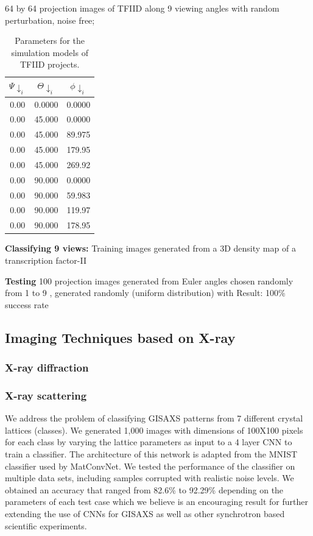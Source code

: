 64 by 64 projection images of TFIID along 9 viewing angles with random perturbation, noise free;

\begin{table}[]
\centering
\caption{Parameters for the simulation models of TFIID projects.}
\label{my-label}
\begin{tabular}{|c|c|c|}
\hline
 $\Psi\downarrow_i$    & $\Theta\downarrow_i$       & $\phi\downarrow_i$
 \\
 \hline
0.00 & 0.0000 & 0.0000 \\
0.00 & 45.000 & 0.0000 \\
0.00 & 45.000 & 89.975 \\
0.00 & 45.000 & 179.95 \\
0.00 & 45.000 & 269.92 \\
0.00 & 90.000 & 0.0000 \\
0.00 & 90.000 & 59.983 \\
0.00 & 90.000 & 119.97 \\
0.00 & 90.000 & 178.95 \\
\hline
\end{tabular}
\end{table}

\textbf{Classifying 9 views:}
Training images generated from a 3D density map of a transcription factor-II

\textbf{Testing}
100 projection images generated from Euler angles
 chosen randomly from 1 to 9
,  generated randomly (uniform distribution) with
Result: 100\% success rate

\subsection{Imaging Techniques based on X-ray}
\subsubsection{X-ray diffraction}

\subsubsection{X-ray scattering}
We address the problem of classifying GISAXS patterns from 7 different crystal lattices (classes). We generated 1,000 images with dimensions of 100X100 pixels for each class by varying the lattice parameters as input to a 4 layer CNN to train a classifier. The architecture of this network is adapted from the MNIST classifier used by MatConvNet. We tested the performance of the classifier on
multiple data sets, including samples corrupted with realistic noise levels. We obtained an accuracy that ranged from 82.6\% to 92.29\% depending on the parameters of each test case which we believe is an encouraging result for further extending the use of CNNs for GISAXS as well as other synchrotron based scientific experiments.


